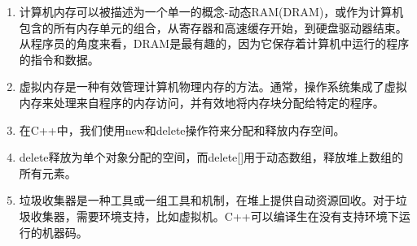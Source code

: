 \begin{enumerate}
	\item 计算机内存可以被描述为一个单一的概念-动态RAM(DRAM)，或作为计算机包含的所有内存单元的组合，从寄存器和高速缓存开始，到硬盘驱动器结束。从程序员的角度来看，DRAM是最有趣的，因为它保存着计算机中运行的程序的指令和数据。
	\item 虚拟内存是一种有效管理计算机物理内存的方法。通常，操作系统集成了虚拟内存来处理来自程序的内存访问，并有效地将内存块分配给特定的程序。
	\item 在C++中，我们使用new和delete操作符来分配和释放内存空间。
	\item delete释放为单个对象分配的空间，而delete[]用于动态数组，释放堆上数组的所有元素。
	\item 垃圾收集器是一种工具或一组工具和机制，在堆上提供自动资源回收。对于垃圾收集器，需要环境支持，比如虚拟机。C++可以编译生在没有支持环境下运行的机器码。
\end{enumerate}












